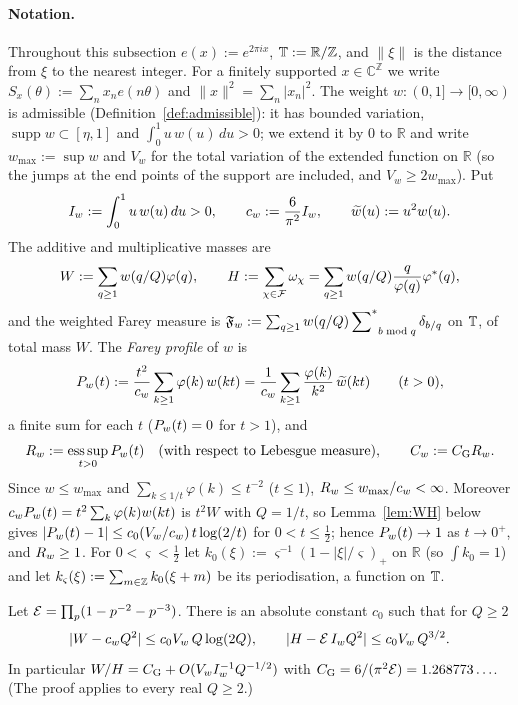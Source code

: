 \paragraph{Notation.}
Throughout this subsection $e(x):=e^{2\pi i x}$, $\mathbb{T}:=\mathbb R/\mathbb Z$,
and $\|\xi\|$ is the distance from $\xi$ to the nearest integer.
For a finitely supported $x\in\mathbb C^{\mathbb Z}$ we write
$S_x(\theta):=\sum_n x_n e(n\theta)$ and $\|x\|^2=\sum_n|x_n|^2$.
The weight $w:(0,1]\to[0,\infty)$ is admissible (Definition~\ref{def:admissible}): it has bounded variation,
$\operatorname{supp}w\subset[\eta,1]$ and $\int_0^1u\,w(u)\,du>0$; we extend it by $0$ to $\mathbb R$ and write $w_{\max}:=\sup w$ and
$V_w$ for the total variation of the extended function on $\mathbb R$ (so the jumps at the
end points of the support are included, and $V_w\ge 2w_{\max}$). Put
\[
 I_w:=\int_0^1 u\,w(u)\,du>0,\qquad c_w:=\frac{6}{\pi^2}I_w,\qquad
 \widetilde w(u):=u^2w(u).
\]
The additive and multiplicative masses are
\[
 W:=\sum_{q\ge1}w(q/Q)\varphi(q),\qquad
 H:=\sum_{\chi\in\mathcal{F}}\omega_\chi=\sum_{q\ge1}w(q/Q)\frac{q}{\varphi(q)}\varphi^*(q),
\]
and the weighted Farey measure is $\mathfrak F_w:=\sum_{q\ge1}w(q/Q)\sideset{}{^*}\sum_{b\bmod q}\delta_{b/q}$ on $\mathbb{T}$,
of total mass $W$. The \emph{Farey profile} of $w$ is
\begin{equation}\label{eqA:Pw}
 P_w(t):=\frac{t^2}{c_w}\sum_{k\ge1}\varphi(k)\,w(kt)=\frac1{c_w}\sum_{k\ge1}\frac{\varphi(k)}{k^2}\,\widetilde w(kt)
 \qquad(t>0),
\end{equation}
a finite sum for each $t$ ($P_w(t)=0$ for $t>1$), and
\begin{equation}\label{eqA:Rw}
 R_w:=\operatorname*{ess\,sup}_{t>0}P_w(t)\quad\text{(with respect to Lebesgue measure)},\qquad C_w:=C_{\mathrm G}R_w .
\end{equation}
Since $w\le w_{\max}$ and $\sum_{k\le 1/t}\varphi(k)\le t^{-2}$ ($t\le1$), $R_w\le w_{\max}/c_w<\infty$. Moreover $c_wP_w(t)=t^2\sum_k\varphi(k)w(kt)$ is $t^2W$ with $Q=1/t$, so Lemma~\ref{lem:WH} below gives $|P_w(t)-1|\le c_0(V_w/c_w)\,t\log(2/t)$ for $0<t\le\frac12$; hence $P_w(t)\to1$ as $t\to0^+$, and $R_w\ge1$.
For $0<\varsigma<\tfrac12$ let $k_0(\xi):=\varsigma^{-1}(1-|\xi|/\varsigma)_+$ on $\mathbb R$ (so $\int k_0=1$) and let
$k_{\varsigma}(\xi):=\sum_{m\in\mathbb Z}k_0(\xi+m)$ be its periodisation, a function on $\mathbb{T}$.

\begin{lemma}\label{lem:WH}
Let $\mathcal{E}=\prod_p(1-p^{-2}-p^{-3})$. There is an absolute constant $c_0$ such that for $Q\ge2$
\[
 |W-c_wQ^2|\le c_0V_w\,Q\log(2Q),\qquad |H-\mathcal{E}\,I_w Q^2|\le c_0V_w\,Q^{3/2}.
\]
In particular $W/H=C_{\mathrm G}+O(V_wI_w^{-1}Q^{-1/2})$ with $C_{\mathrm G}=6/(\pi^2\mathcal{E})=1.268773\ldots$. (The proof applies to every real $Q\ge2$.)
\end{lemma}

